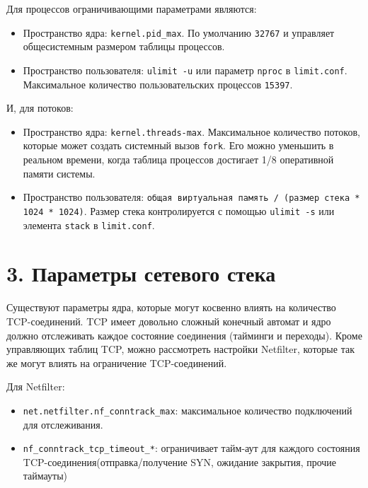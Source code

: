 Для процессов ограничивающими параметрами являются:
\begin{itemize}
    \item Пространство ядра: \texttt{kernel.pid\_max}. По умолчанию \texttt{32767} и управляет общесистемным размером таблицы процессов.
    \item Пространство пользователя: \texttt{ulimit -u} или параметр \texttt{nproc} в \texttt{limit.conf}. Максимальное количество пользовательских процессов \texttt{15397}.
\end{itemize}

И, для потоков:
\begin{itemize}
    \item Пространство ядра: \texttt{kernel.threads-max}. Максимальное количество потоков, которые может создать системный вызов \texttt{fork}. Его можно уменьшить в реальном времени, когда таблица процессов достигает 1/8 оперативной памяти системы.
    \item Пространство пользователя: \texttt{общая виртуальная память / (размер стека * 1024 * 1024)}. Размер стека контролируется с помощью \texttt{ulimit -s} или элемента \texttt{stack} в \texttt{limit.conf}.
\end{itemize}

\section*{3. Параметры сетевого стека}

Существуют параметры ядра, которые могут косвенно влиять на количество TCP-соединений. TCP имеет довольно сложный конечный автомат и ядро должно отслеживать каждое состояние соединения (тайминги и переходы). Кроме управляющих таблиц TCP, можно рассмотреть настройки Netfilter, которые так же могут влиять на ограничение TCP-соединений.

Для Netfilter:
\begin{itemize}
    \item \texttt{net.netfilter.nf\_conntrack\_max}: максимальное количество подключений для отслеживания.
    \item \texttt{nf\_conntrack\_tcp\_timeout\_*}: ограничивает тайм-аут для каждого состояния TCP-соединения(отправка/получение SYN, ожидание закрытия, прочие таймауты)
\end{itemize}

